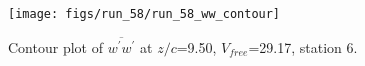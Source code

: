 \begin{figure}[H]
\centering
\texttt{[image: figs/run\_58/run\_58\_ww\_contour]}
\caption{Contour plot of $\overline{w^\prime w^\prime}$ at $z/c$=9.50, $V_{free}$=29.17, station 6.}
\label{fig:run_58_ww_contour}
\end{figure}


